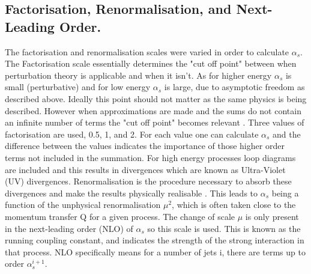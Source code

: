 \documentclass[12pt, onecolumn]{revtex4}    %
\begin{document}
\subsection{Factorisation, Renormalisation, and Next-Leading Order.} 

The factorisation and renormalisation scales were varied in order to calculate ${\alpha _s}$. The Factorisation scale essentially determines the "cut off point" between when perturbation theory is applicable and when it isn't. As  for higher energy ${\alpha _s}$ is small (perturbative) and for low energy ${\alpha _s}$ is large, due to asymptotic freedom as described above. Ideally this point should not matter as the same physics is being described. However when approximations are made and the sums do not contain an infinite number of terms the "cut off point" becomes relevant \cite{PHD}. Three values of factorisation are used, 0.5, 1, and 2. For each value one can calculate ${\alpha _s}$ and the difference between the values indicates the importance of those higher order terms not included in the summation. 
For high energy processes loop diagrams are included and this results in divergences which are known as Ultra-Violet (UV) divergences. Renormalisation is the procedure necessary to absorb these divergences and make the results physically realisable \cite{PHD}. This leads to ${\alpha _s}$ being a function of the unphysical renormalisation ${\mu^2}$, which is often taken close to the momentum transfer Q for a given process. The change of scale ${\mu}$ is only present in the next-leading order (NLO) of ${\alpha _s}$ so this scale is used.  This is known as the running coupling constant, and indicates the strength of the strong interaction in that process. NLO specifically means for a number of jets i, there are terms up to order ${\alpha _s^{i+1}}$. 
\end{document}
